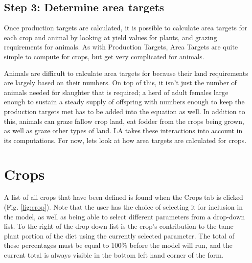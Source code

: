 \subsection{Step 3: Determine area targets}
Once production targets are calculated, it is possible to calculate area
targets for each crop and animal by looking at yield values for plants, and
grazing requirements for animals.  As with Production Targets, Area Targets are
quite simple to compute for crops, but get very complicated for animals.

Animals are difficult to calculate area targets for because their land
requirements are largely based on their numbers.  On top of this, it isn't just
the number of animals needed for slaughter that is required;  a herd of adult
females large enough to sustain a steady supply of offspring with numbers
enough to keep the production targets met has to be added into the equation as
well.  In addition to this, animals can graze fallow crop land, eat fodder from
the crops being grown, as well as graze other types of land.  LA takes these
interactions into account in its computations.  For now, lets look at how area
targets are calculated for crops.

  \section{Crops}
    A list of all crops that have been defined is found when the Crops tab is
    clicked (Fig. \ref{fig:crop}).  Note that the user has the choice of
    selecting it for inclusion in the model, as well as being able to select
    different parameters from a drop-down list.  To the right of the drop down
    list is the crop's contribution to the tame plant portion of the diet using
    the currently selected parameter.  The total of these percentages must be
    equal to $100\%$ before the model will run, and the current total is always
    visible in the bottom left hand corner of the form.

